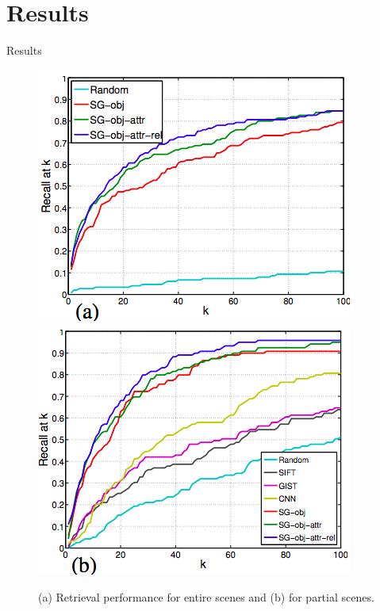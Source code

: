 \documentclass{IFES-beamer}
\begin{document}
\section{Results}
    \begin{frame}{Results}
        \begin{figure}
            \centering
            \includegraphics[scale=0.4]{Images/graph_a.png}
            \includegraphics[scale=0.4]{Images/graph_b.png}
            \caption{\cite{Johnson_2015_CVPR}(a) Retrieval performance for entire scenes and (b) for partial scenes.}
            \label{fig:my_label}
        \end{figure}
    \end{frame}
    
\end{document}

